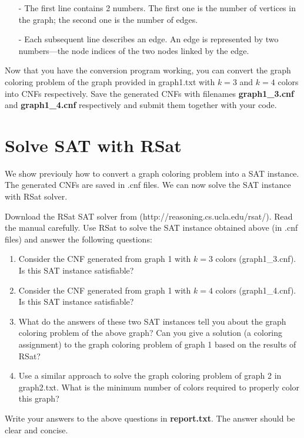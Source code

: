 \documentclass[10pt]{article}
\begin{document}
\begin{itemize}
    \item[-] The first line contains 2 numbers. The first one is the number of vertices in the graph; the second one is the number of edges.
    \item[-] Each subsequent line describes an edge. An edge is represented by two numbers—the node indices of the two nodes linked by the edge.
\end{itemize}

Now that you have the conversion program working, you can convert the graph coloring problem of the graph provided in graph1.txt with $k=3$ and $k=4$ colors into CNFs respectively. Save the generated CNFs with filenames \textbf{ graph1\_3.cnf} and \textbf{ graph1\_4.cnf} respectively and submit them together with your code.

\section{Solve SAT with RSat}
We show previouly how to convert a graph coloring problem into a SAT instance. The generated CNFs are saved in .cnf files. We can now solve the SAT instance with RSat solver.

Download the RSat SAT solver from (http://reasoning.cs.ucla.edu/rsat/). Read the manual carefully. Use RSat to solve the SAT instance obtained above (in .cnf files) and answer the following questions:

\begin{enumerate}
    \item Consider the CNF generated from graph 1 with $k=3$ colors (graph1\_3.cnf). Is this SAT instance satisfiable?
    \item Consider the CNF generated from graph 1 with $k=4$ colors (graph1\_4.cnf). Is this SAT instance satisfiable?
    \item What do the answers of these two SAT instances tell you about the graph coloring problem of the above graph? Can you give a solution (a coloring assignment) to the graph coloring problem of graph 1 based on the results of RSat?
    \item Use a similar approach to solve the graph coloring problem of graph 2 in graph2.txt. What is the minimum number of colors required to properly color this graph?
\end{enumerate}

Write your answers to the above questions in \textbf{report.txt}. The answer should be clear and concise.
\end{document}
